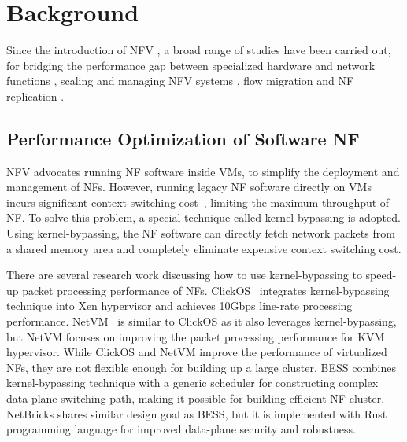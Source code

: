 \chapter {Background}
\label{ch:background}

Since the introduction of NFV \cite{nfv-white-paper}, a broad range of studies have been carried out, for bridging the performance gap between specialized hardware and network functions \cite{hwang2015netvm, bess, martins2014clickos, 199352}, scaling and managing NFV systems \cite{gember2012stratos, palkar2015e2, 211243}, flow migration \cite{rajagopalan2013split, khalid2016paving, gember2015opennf, qazi2017high} and NF replication \cite{rajagopalan2013pico, sherry2015rollback}.

\section{Performance Optimization of Software NF}

NFV advocates running NF software inside VMs, to simplify the deployment and management of NFs. However, running legacy NF software directly on VMs incurs significant context switching cost~\cite{rizzo2013speeding}, limiting the maximum throughput of NF. To solve this problem, a special technique called kernel-bypassing \cite{180843} is adopted. Using kernel-bypassing, the NF software can directly fetch network packets from a shared memory area and completely eliminate expensive context switching cost.

There are several research work discussing how to use kernel-bypassing to speed-up packet processing performance of NFs. ClickOS~\cite{martins2014clickos} integrates kernel-bypassing technique into Xen \cite{xen} hypervisor and achieves 10Gbps line-rate processing performance. NetVM~\cite{hwang2015netvm} is similar to ClickOS as it also leverages kernel-bypassing, but NetVM focuses on improving the packet processing performance for KVM \cite{kvm} hypervisor. While ClickOS and NetVM improve the performance of virtualized NFs, they are not flexible enough for building up a large cluster. BESS \cite{bess} combines kernel-bypassing technique with a generic scheduler for constructing complex data-plane switching path, making it possible for building efficient NF cluster. NetBricks \cite{199352} shares similar design goal as BESS, but it is implemented with Rust \cite{rust} programming language for improved data-plane security and robustness.

